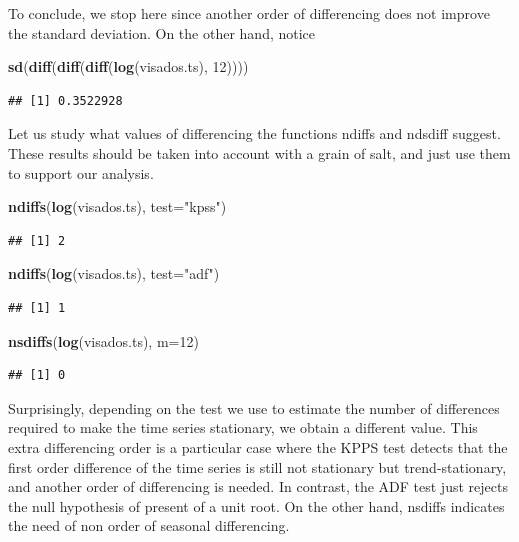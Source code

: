 \documentclass[]{article}
\newenvironment{Shaded}{\begin{snugshade}}{\end{snugshade}}
\newcommand{\KeywordTok}[1]{\textcolor[rgb]{0.13,0.29,0.53}{\textbf{{#1}}}}
\newcommand{\DataTypeTok}[1]{\textcolor[rgb]{0.13,0.29,0.53}{{#1}}}
\newcommand{\DecValTok}[1]{\textcolor[rgb]{0.00,0.00,0.81}{{#1}}}
\newcommand{\StringTok}[1]{\textcolor[rgb]{0.31,0.60,0.02}{{#1}}}
\newcommand{\NormalTok}[1]{{#1}}
\begin{document}
To conclude, we stop here since another order of differencing does not
improve the standard deviation. On the other hand, notice

\begin{Shaded}
\begin{Highlighting}[]
\KeywordTok{sd}\NormalTok{(}\KeywordTok{diff}\NormalTok{(}\KeywordTok{diff}\NormalTok{(}\KeywordTok{diff}\NormalTok{(}\KeywordTok{log}\NormalTok{(visados.ts), }\DecValTok{12}\NormalTok{))))}
\end{Highlighting}
\end{Shaded}

\begin{verbatim}
## [1] 0.3522928
\end{verbatim}

Let us study what values of differencing the functions ndiffs and
ndsdiff suggest. These results should be taken into account with a grain
of salt, and just use them to support our analysis.

\begin{Shaded}
\begin{Highlighting}[]
\KeywordTok{ndiffs}\NormalTok{(}\KeywordTok{log}\NormalTok{(visados.ts), }\DataTypeTok{test=}\StringTok{"kpss"}\NormalTok{)}
\end{Highlighting}
\end{Shaded}

\begin{verbatim}
## [1] 2
\end{verbatim}

\begin{Shaded}
\begin{Highlighting}[]
\KeywordTok{ndiffs}\NormalTok{(}\KeywordTok{log}\NormalTok{(visados.ts), }\DataTypeTok{test=}\StringTok{"adf"}\NormalTok{)}
\end{Highlighting}
\end{Shaded}

\begin{verbatim}
## [1] 1
\end{verbatim}

\begin{Shaded}
\begin{Highlighting}[]
\KeywordTok{nsdiffs}\NormalTok{(}\KeywordTok{log}\NormalTok{(visados.ts), }\DataTypeTok{m=}\DecValTok{12}\NormalTok{)}
\end{Highlighting}
\end{Shaded}

\begin{verbatim}
## [1] 0
\end{verbatim}

Surprisingly, depending on the test we use to estimate the number of
differences required to make the time series stationary, we obtain a
different value. This extra differencing order is a particular case
where the KPPS test detects that the first order difference of the time
series is still not stationary but trend-stationary, and another order
of differencing is needed. In contrast, the ADF test just rejects the
null hypothesis of present of a unit root. On the other hand, nsdiffs
indicates the need of non order of seasonal differencing.
\end{document}
